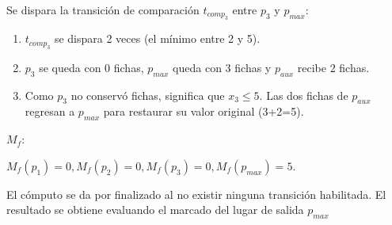 Se dispara la transición de comparación $t_{comp_3}$ entre $p_3$ y $p_{max}:$
\begin{enumerate}
    \item $t_{comp_3}$ se dispara 2 veces (el mínimo entre 2 y 5).
    \item $p_3$ se queda con 0 fichas, $p_{max}$ queda con 3 fichas y $p_{aux}$ recibe 2 fichas.
    \item Como $p_3$ no conservó fichas, significa que $x_3 \leq 5$. Las dos fichas de $p_{aux}$ regresan a $p_{max}$ para restaurar su valor original (3+2=5).
\end{enumerate}
$M_f:$
\begin{center}
    $M_f(p_1)=0,M_f(p_2)=0, M_f(p_3)=0,M_f(p_{max})=5. $
\end{center}
El cómputo se da por finalizado al no existir ninguna transición habilitada. El resultado se obtiene evaluando el marcado del lugar de salida $p_{max}$
